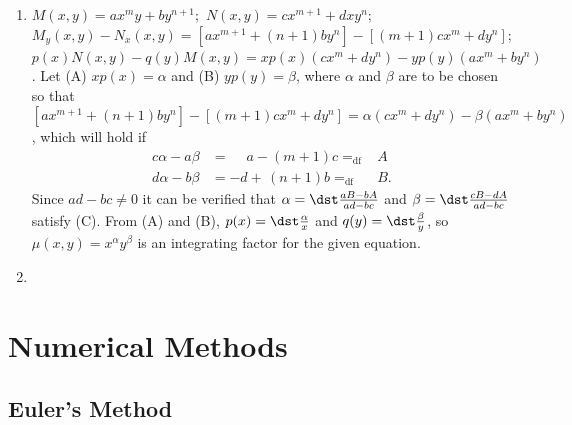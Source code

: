 \documentclass[openany]{book}
\newenvironment{sectionSolutions}{
 \begin{enumerate}[item-label={\thesection.\arabic{enumi}.}]
}{
 \end{enumerate}
}
\begin{document}
\begin{sectionSolutions}
\item
$M(x,y)=ax^my+by^{n+1}$;\ $N(x,y)=cx^{m+1}+dxy^n$;\;
$M_y(x,y)-N_x(x,y)=\left[ax^{m+1}+(n+1)by^n\right]-\left[(m+1)cx^m
+dy^n\right]$;\;
$p(x)N(x,y)-q(y)M(x,y)=xp(x)(cx^m+dy^n)-yp(y)(ax^m+by^n)$.
Let (A)  $xp(x)=\alpha$ and (B) $yp(y)=\beta$, where $\alpha$
and $\beta$ are to be chosen so that
$\left[ax^{m+1}+(n+1)by^n\right]-\left[(m+1)cx^m
+dy^n\right]=\alpha(cx^m+dy^n)-\beta(ax^m+by^n)$, which will hold if
\[
\begin{aligned}
c\alpha-a\beta&=\phantom{-}a-(m+1)c=_{\mathrm{df}}&A\\
d\alpha-b\beta&=-d+\,(n+1)b=_{\mathrm{df}}&B.
\end{aligned}
\tag{C}
\]
Since $ad-bc\ne0$ it can be verified that
$\alpha=\dst\frac{aB-bA}{ ad-bc}$ and $\beta=\dst\frac{cB-dA}{ ad-bc}$
satisfy (C). From (A) and (B),
$p(x)=\dst\frac{\alpha}{ x}$ and $q(y)=\dst\frac{\beta}{ y}$, so
$\mu(x,y)=x^\alpha y^\beta$  is an integrating factor for the given
equation.


\item
{}
\end{sectionSolutions}

\chapter{Numerical Methods}

\section{Euler's Method}
\end{document}
